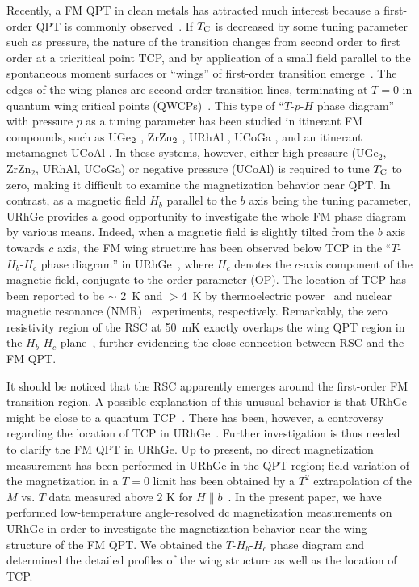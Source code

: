 \documentclass[twocolumn, aps, superscriptaddress, amsfonts,floatfix]{revtex4}%
\begin{document}
Recently, a FM QPT in clean metals has attracted much interest because a first-order QPT is commonly observed~\cite{RevModPhys.88.025006}.
If $T_{\rm C}$ is decreased by some tuning parameter such as pressure, the nature of the transition changes from second order to first order  at a tricritical point TCP,  and by application of a small field parallel to the spontaneous moment surfaces or ``wings'' of first-order transition emerge~\cite{belitz1999first, PhysRevLett.94.247205}.
The edges of the wing planes are second-order transition lines, terminating at $T=0$ in quantum wing critical points (QWCPs)~\cite{PhysRevLett.115.020402}.
This type of ``$T$-$p$-$H$ phase diagram'' with pressure $p$ as a tuning parameter has been studied in itinerant FM compounds, such as UGe$\rm_2$ \cite{taufour2010tricritical, pfleiderer2002pressure, kotegawa2011evolution}, ZrZn$\rm_2$ \cite{uhlarz2004quantum}, URhAl \cite{PhysRevB.91.125115}, UCoGa \cite{mivsek2017pressure}, and an itinerant metamagnet UCoAl \cite{aoki2011ferromagnetic}.
In these systems, however, either high pressure (UGe$_2$, ZrZn$_2$, URhAl, UCoGa) or negative pressure (UCoAl) is required to tune $T_{\rm C}$ to zero, making it difficult to examine the magnetization behavior near QPT.
In contrast, as a magnetic field $H_b$ parallel to the $b$ axis being the tuning parameter, URhGe provides a good opportunity to investigate the whole FM phase diagram by various means.
Indeed, when a magnetic field is slightly tilted from the $b$ axis towards $c$ axis, the FM wing structure has been observed below TCP in the  ``$T$-$H_{b}$-$H_{c}$ phase diagram'' in URhGe~\cite{levy2007acute, levy2009coexistence}, where $H_{c}$ denotes the $c$-axis component of the magnetic field, conjugate to the order parameter (OP).
The location of TCP has been reported to be $\sim$ 2~K and  $>4$~K by thermoelectric power~\cite{gourgout2016collapse} and nuclear magnetic resonance (NMR)~\cite{kotegawa201573ge} experiments, respectively.
Remarkably, the zero resistivity region of the RSC at 50~mK exactly overlaps the wing QPT region in the $H_{b}$-$H_{c}$ plane~\cite{levy2007acute, levy2009coexistence}, further evidencing the close connection between RSC and the FM QPT.

It should be noticed that the RSC apparently emerges around the  first-order FM transition region. 
A possible explanation of this unusual behavior is that URhGe might be close to a quantum TCP~\cite{levy2007acute}.
There has been, however, a controversy regarding the location of TCP in URhGe~\cite{gourgout2016collapse,kotegawa201573ge}.
Further investigation is thus needed to clarify the FM QPT in URhGe.
Up to present, no direct magnetization measurement has been performed in URhGe in the QPT region; field variation of the magnetization in a $T=0$ limit has  been obtained by a $T^2$ extrapolation of the $M$ vs. $T$ data measured above 2 K for  $H \parallel b$~\cite{hardy2011transverse}. 
In the present paper, we have performed low-temperature angle-resolved dc magnetization measurements on URhGe in order to investigate the magnetization behavior near the wing structure of the FM QPT.
We obtained the $T$-$H_{b}$-$H_{c}$ phase diagram and determined the detailed profiles of the wing structure as well as the location of TCP.
\end{document}
